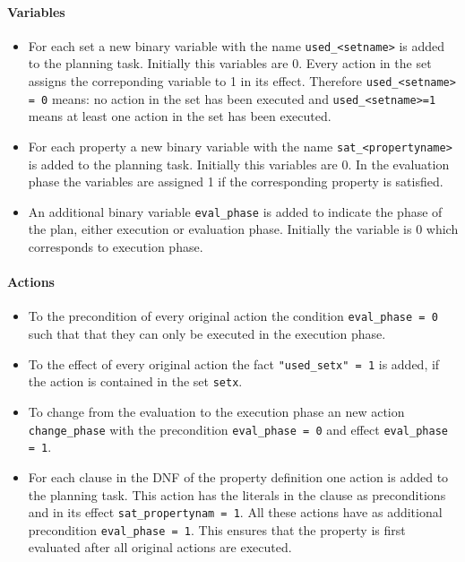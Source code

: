 \documentclass{article}
\begin{document}
\paragraph{Variables}

\begin{itemize}
\item
For each set a new binary variable with the name \texttt{used\_<setname>} is added to the planning task. 
Initially this variables are 0. Every action in the set assigns the correponding variable to 1 in its effect. 
Therefore \texttt{used\_<setname> = 0} means: no action in the set has been executed and \texttt{used\_<setname>=1}
means at least one action in the set has been executed.

\item 
For each property a new binary variable with the name \texttt{sat\_<propertyname>} is added to the planning task.
Initially this variables are 0. In the evaluation phase the variables are assigned 1 if the corresponding 
property is satisfied.

\item 
An additional binary variable \texttt{eval\_phase} is added to indicate the phase of the plan, either execution 
or evaluation phase. Initially the variable is 0 which corresponds to execution phase.
\end{itemize}

\paragraph{Actions}

\begin{itemize}
\item
	To the precondition of every original action the condition \texttt{eval\_phase = 0} such that that
	they can only be executed in the execution phase.

\item
	To the effect of every original action the fact \texttt{"used\_setx" = 1} is added, if the action
	is contained in the set \texttt{setx}.

\item 
	To change from the evaluation to the execution phase an new action \texttt{change\_phase} with the
	precondition \texttt{eval\_phase = 0} and effect \texttt{eval\_phase = 1}.

\item 
	For each clause in the DNF of the property definition one action is added to the planning task.
	This action has the literals in the clause as preconditions and in its effect \texttt{sat\_propertynam = 1}. 
	All these actions have as additional precondition \texttt{eval\_phase = 1}. This ensures that the 
	property is first evaluated after all original actions are executed. 
\end{itemize}
\end{document}
